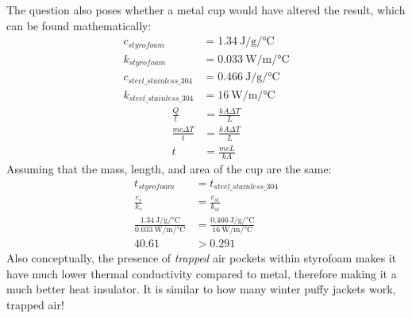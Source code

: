 \documentclass{article}
\begin{document}
The question also poses whether a metal cup would have altered the result, which can be found mathematically:
\begin{align*}
	c_{styrofoam} & = \SI{1.34}{\joule \per \gram \per \celsius} \\
	k_{styrofoam} & = \SI{0.033}{\watt \per \meter \per \celsius} \\
	c_{steel\_stainless\_304} & = \SI{0.466}{\joule \per \gram \per \celsius} \\
	k_{steel\_stainless\_304} & = \SI{16}{\watt \per \meter \per \celsius}
\end{align*}
\begin{align*}
	\frac{ Q }{ t } & = \frac{ kA\Delta T}{ L } \\
	\frac{ mc\Delta T }{ t } & = \frac{ kA\Delta T }{ L } \\
	t & = \frac{ mcL }{ kA }
\end{align*}
Assuming that the mass, length, and area of the cup are the same:
\begin{align*}
	t_{styrofoam} & = t_{steel\_stainless\_304} \\
	\frac{ c_{s} }{ k_{s} } & = \frac{ c_{st} }{ k_{st} } \\
	\frac{ \SI{1.34}{\joule \per \gram \per \celsius} }{ \SI{0.033}{\watt \per \meter \per \celsius} } & = \frac{ \SI{0.466}{\joule \per \gram \per \celsius} }{ \SI{16}{\watt \per \meter \per \celsius} } \\
	40.61 & > 0.291
\end{align*}
Also conceptually, the presence of \textit{trapped} air pockets within styrofoam makes it have much lower thermal conductivity compared to metal, therefore making it a much better heat insulator. It is similar to how many winter puffy jackets work, trapped air!
\end{document}
